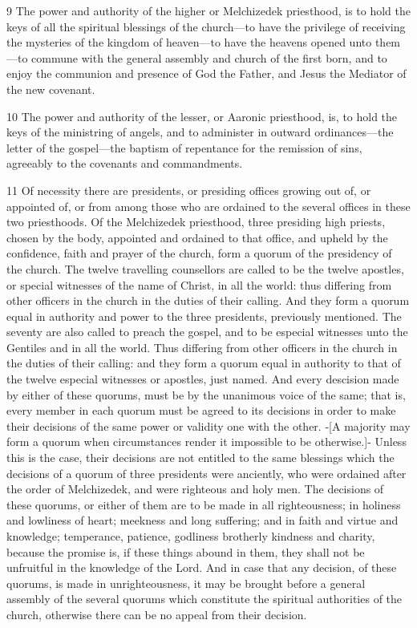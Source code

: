 				9 The power and authority of the higher or Melchizedek priesthood, is to hold the keys of all the spiritual blessings of the church---to have the privilege of receiving the mysteries of the kingdom of heaven---to have the heavens opened unto them---to commune with the general assembly and church of the first born, and to enjoy the communion and presence of God the Father, and Jesus the Mediator of the new covenant.

				10 The power and authority of the lesser, or Aaronic priesthood, is, to hold the keys of the ministring of angels, and to administer in outward ordinances---the letter of the gospel---the baptism of repentance for the remission of sins, agreeably to the covenants and commandments.

				11 Of necessity there are presidents, or presiding offices growing out of, or appointed of, or from among those who are ordained to the several offices in these two priesthoods. Of the Melchizedek priesthood, three presiding high priests, chosen by the body, appointed and ordained to that office, and upheld by the confidence, faith and prayer of the church, form a quorum of the presidency of the church. The twelve travelling counsellors are called to be the twelve apostles, or special witnesses of the name of Christ, in all the world: thus differing from other officers in the church in the duties of their calling. And they form a quorum equal in authority and power to the three presidents, previously mentioned. The seventy are also called to preach the gospel, and to be especial witnesses unto the Gentiles and in all the world. Thus differing from other officers in the church in the duties of their calling: and they form a quorum equal in authority to that of the twelve especial witnesses or apostles, just named. And every descision made by either of these quorums, must be by the unanimous voice of the same; that is, every member in each quorum must be agreed to its decisions in order to make their decisions of the same power or validity one with the other. -[A majority may form a quorum when circumstances render it impossible to be otherwise.]- Unless this is the case, their decisions are not entitled to the same blessings which the decisions of a quorum of three presidents were anciently, who were ordained after the order of Melchizedek, and were righteous and holy men. The decisions of these quorums, or either of them are to be made in all righteousness; in holiness and lowliness of heart; meekness and long suffering; and in faith and virtue and knowledge; temperance, patience, godliness brotherly kindness and charity, because the promise is, if these things abound in them, they shall not be unfruitful in the knowledge of the Lord. And in case that any decision, of these quorums, is made in unrighteousness, it may be brought before a general assembly of the several quorums which constitute the spiritual authorities of the church, otherwise there can be no appeal from their decision.

